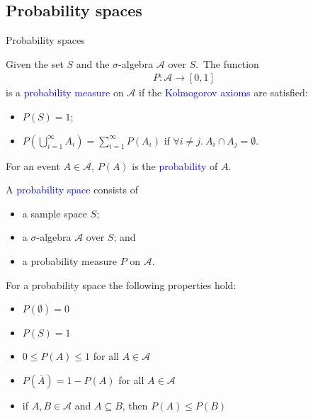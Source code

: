 \documentclass{beamer}
\def\b{\textcolor{blue}}
\begin{document}
\subsection{Probability spaces}
\begin{frame}{Probability spaces}
    \begin{definition}
        Given the set $S$ and the $\sigma$-algebra $\mathcal{A}$ over $S$.\pause\ The function
        \begin{align*}
            P: \mathcal{A} \to [0,1]
        \end{align*}
        is a \b{probability measure} on $\mathcal{A}$ if the \b{Kolmogorov axioms} are satisfied:
        \begin{itemize}\pause
            \item $P(S) = 1$;\pause
            \item $P(\bigcup_{i=1}^{\infty} A_i) = \sum_{i=1}^{\infty} P(A_i)$ if $\forall i \neq j.\ A_i \cap A_j = \emptyset$.
        \end{itemize}
    \end{definition}
\end{frame}

\begin{frame}
    \begin{definition}
        For an event $A \in \mathcal{A}$, $P(A)$ is the \b{probability} of $A$.
    \end{definition}\pause
    \begin{definition}
        A \b{probability space} consists of
        \begin{itemize}
            \item a sample space $S$;
            \item a $\sigma$-algebra $\mathcal{A}$ over $S$; and
            \item a probability measure $P$ on $\mathcal{A}$.
        \end{itemize}
    \end{definition}
\end{frame}

\begin{frame}
    For a probability space the following properties hold:\pause
    \begin{itemize}
        \item $P(\emptyset) = 0$\pause
        \item $P(S) = 1$\pause
        \item $0 \leq P(A) \leq 1$ for all $A \in \mathcal{A}$\pause
        \item $P(\bar{A}) = 1 - P(A)$ for all $A \in \mathcal{A}$\pause
        \item if $A, B \in \mathcal{A}$ and $A \subseteq B$, then $P(A) \leq P(B)$
    \end{itemize}
\end{frame}
\end{document}
